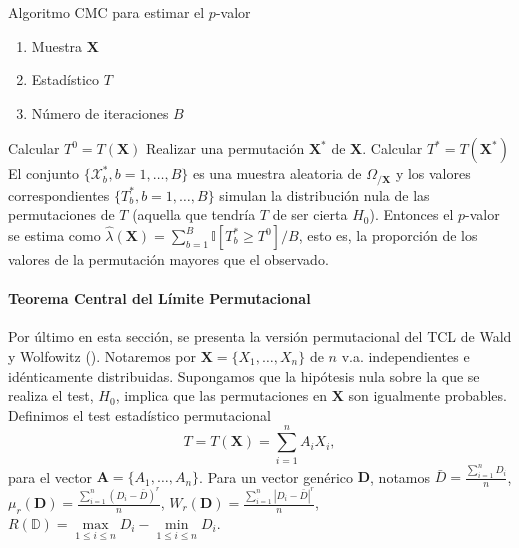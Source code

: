 \begin{algorithm}
	\caption{Algoritmo CMC para estimar el $p$-valor}
	\label{alg:CMC-pvalue}
	\begin{algorithmic}[1]
	\REQUIRE
		\begin{enumerate}[a]
		\item Muestra $\mathbf{X}$
		\item Estadístico $T$
		\item Número de iteraciones $B$
		\end{enumerate}
		\STATE Calcular $T^0 = T(\mathbf{X})$
			\STATE Realizar una permutación $\mathbf{X}^*$ de  
			$\mathbf{X}$.
			\STATE Calcular $T^* = T(\mathbf{X}^*)$
		\ENDFOR
		\STATE El conjunto $\{ \mathcal{X}^*_b, b = 1, \dots, 
		B \}$ es una muestra aleatoria de 
		$\Omega_{/\mathbf{X}}$ y los valores correspondientes 
		$\{ T^*_b, b = 1, \dots, B \}$ simulan la 
		distribución nula de las permutaciones de $T$ 
		(aquella que tendría $T$ de ser cierta $H_0$). 
		Entonces el $p$-valor se estima como $\hat{\lambda}
		(\mathbf{X}) = \sum\limits_{b=1}^B 
		\mathbb{I}[T_b^* \geq T^0]/B$, esto es, la proporción 
		de los valores de la permutación mayores que el 
		observado.
	\end{algorithmic}
\end{algorithm}

\paragraph{Teorema Central del Límite Permutacional}
	Por último en esta sección, se presenta la versión 
permutacional del TCL de Wald y Wolfowitz (\cite{wald1944}).
Notaremos por $\mathbf{X} = \{X_1, \dots, X_n\}$ de $n$ v.a. 
independientes e idénticamente distribuidas. Supongamos que 
la hipótesis nula sobre la que se realiza el test, $H_0$, 
implica que las permutaciones en $\mathbf{X}$ son igualmente 
probables.\\
	Definimos el test estadístico permutacional
	\[
		T = T(\mathbf{X}) = 
			\sum\limits_{i=1}^n
				A_i X_i,
	\]
	para el vector $\mathbf{A} = \{A_1, \dots, A_n\}$. Para 
un vector genérico $\mathbf{D}$, notamos $\bar{D} = 
\frac{\sum\limits_{i=1}^n D_i}{n}$, $\mu_r(\mathbf{D}) = 
\frac{\sum\limits_{i=1}^n (D_i - \bar{D})^r}{n}$, 
$W_r(\mathbf{D}) = \frac{\sum\limits_{i=1}^n 
|D_i - \bar{D}|^r}{n}$, $R(\mathbb{D}) = 
\underset{1 \leq i \leq n}{\max} D_i - 
\underset{1 \leq i \leq n}{\min} D_i$.\\

